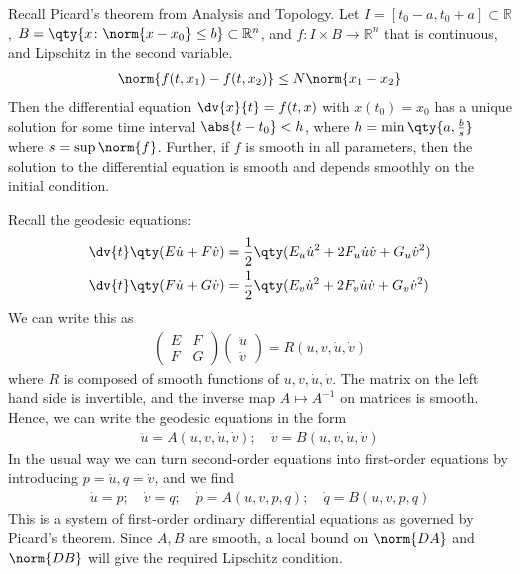 Recall Picard's theorem from Analysis and Topology.
Let $I = [t_0 - a, t_0 + a] \subset \mathbb R$, $B = \qty{x \colon \norm{x-x_0} \leq b} \subset \mathbb R^n$, and $f \colon I \times B \to \mathbb R^n$ that is continuous, and Lipschitz in the second variable.
\begin{align*}
	\norm{f(t,x_1) - f(t,x_2)} \leq N \norm{x_1-x_2}
\end{align*}
Then the differential equation $\dv{x}{t} = f(t,x)$ with $x(t_0) = x_0$ has a unique solution for some time interval $\abs{t-t_0} < h$, where $h = \min\qty{a,\frac{b}{s}}$ where $s = \sup \norm{f}$.
Further, if $f$ is smooth in all parameters, then the solution to the differential equation is smooth and depends smoothly on the initial condition.

Recall the geodesic equations:
\begin{align*}
	\dv{t} \qty(E \dot u + F \dot v) & = \frac{1}{2} \qty( E_u \dot u^2 + 2F_u \dot u \dot v + G_u \dot v^2 ) \\
	\dv{t} \qty(F \dot u + G \dot v) & = \frac{1}{2} \qty( E_v \dot u^2 + 2F_v \dot u \dot v + G_v \dot v^2 )
\end{align*}
We can write this as
\begin{align*}
	\begin{pmatrix}
		E & F \\
		F & G
	\end{pmatrix} \begin{pmatrix}
		\ddot u \\
		\ddot v
	\end{pmatrix}= R(u,v, \dot{u}, \dot{v})
\end{align*}
where $R$ is composed of smooth functions of $u,v, \dot{u}, \dot{v}$.
The matrix on the left hand side is invertible, and the inverse map $A \mapsto A^{-1}$ on matrices is smooth.
Hence, we can write the geodesic equations in the form
\begin{align*}
	\ddot u = A(u, v, \dot u, \dot v);\quad \ddot v = B(u, v, \dot u, \dot v)
\end{align*}
In the usual way we can turn second-order equations into first-order equations by introducing $p = \dot u, q = \dot v$, and we find
\begin{align*}
	\dot u = p;\quad \dot v = q;\quad \dot p = A(u,v,p,q);\quad \dot q = B(u,v,p,q)
\end{align*}
This is a system of first-order ordinary differential equations as governed by Picard's theorem.
Since $A, B$ are smooth, a local bound on $\norm{DA}$ and $\norm{DB}$ will give the required Lipschitz condition.

